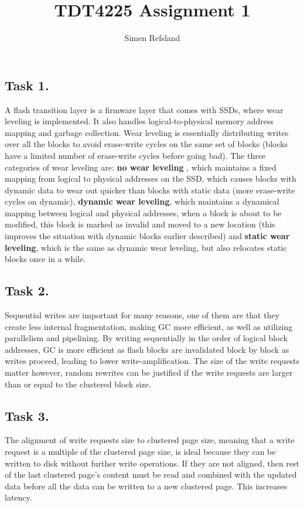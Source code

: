 \documentclass[12pt, titlepage]{report}
\title{TDT4225 Assignment 1}
\author{Simen Refsland}
\date{}
\begin{document}
\maketitle
\pagestyle{fancy}
\newpage
\subsection*{Task 1.}
A flash transition layer is a firmware layer that comes with SSDs, where wear leveling is implemented. It also handles logical-to-physical memory address mapping and garbage collection. Wear leveling is essentially distributing writes over all the blocks to avoid erase-write cycles on the same set of blocks (blocks have a limited number of erase-write cycles before going bad). The three categories of wear leveling are: \textbf{no wear leveling} , which maintains a fixed mapping from logical to physical addresses on the SSD, which causes blocks with dynamic data to wear out quicker than blocks with static data (more erase-write cycles on dynamic), \textbf{dynamic wear leveling}, which maintains a dynamical mapping between logical and physical addresses, when a block is about to be modified, this block is marked as invalid and moved to a new location (this improves the situation with dynamic blocks earlier described) and \textbf{static wear leveling}, which is the same as dynamic wear leveling, but also relocates static blocks once in a while. 
\subsection*{Task 2.}
Sequential writes are important for many reasons, one of them are that they create less internal fragmentation, making GC more efficient, as well as utilizing  parallelism and pipelining. By writing sequentially in the order of logical block addresses, GC is more efficient as flash blocks are invalidated block by block as writes proceed, leading to lower write-amplification. The size of the write requests matter however, random rewrites can be justified if the write requests are larger than or equal to the clustered block size.
\subsection*{Task 3.}
The alignment of write requests size to clustered page size, meaning that a write request is a multiple of the clustered page size, is ideal because they can be written to disk without further write operations. If they are not aligned, then rest of the last clustered page's content must be read and combined with the updated data before all the data can be written to a new clustered page. This increases latency.
\end{document}
